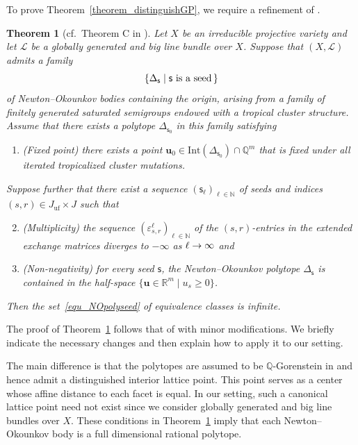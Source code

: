 \documentclass[11pt]{amsart}
\newcommand{\Q}{\mathbb{Q}}
\newcommand{\R}{\mathbb{R}}
\def\mcal{\mathcal}
\numberwithin{equation}{section}
\theoremstyle{plain}
\newtheorem{theorem}{Theorem}[section]
\theoremstyle{definition}
\def\to{\mathchoice{\longrightarrow}{\rightarrow}{\rightarrow}{\rightarrow}}
\numberwithin{equation}{section}
\newcommand{\seed}{\mathsf{s}}
\begin{document}
To prove Theorem~\ref{theorem_distinguishGP}, we require a refinement of \cite[Theorem C]{CKKP25}.

\begin{theorem}[cf.\ Theorem C in \cite{CKKP25}]\label{theorem_maincriterion}
Let $X$ be an irreducible projective variety and let $\mathcal{L}$ be a globally generated and big line bundle over $X$. Suppose that $(X, \mcal{L})$ admits a family 
$$
\{ \Delta_\seed \mid \mbox{$\seed$ is a seed\,} \}
$$
of Newton--Okounkov bodies containing the origin, arising from a family of finitely generated saturated semigroups endowed with a tropical cluster structure. Assume that there exists a polytope $\Delta_{\seed_0}$ in this family satisfying 
\begin{enumerate}
\item (Fixed point) there exists a point $\mathbf{u}_0 \in \mathrm{Int}(\Delta_{\seed_0}) \cap \Q^m$ that is fixed under all iterated tropicalized cluster mutations. 
\end{enumerate}
Suppose further that there exist a sequence $\left( \seed_\ell \right)_{\ell \in \mathbb{N}}$ of seeds and indices $(s, r) \in J_\mathrm{uf} \times J$ such that
\begin{enumerate}
\setcounter{enumi}{1}
\item (Multiplicity) the sequence $( \varepsilon^\ell_{s, r} )_{\ell \in \mathbb{N}}$ of the $(s, r)$-entries in the extended exchange matrices diverges to $- \infty$ as $\ell \to \infty$ and
\item (Non-negativity) for every seed $\seed$, the Newton--Okounkov polytope $\Delta_{\seed}$ is contained in the half-space $\{ \mathbf{u} \in \R^m \mid u_s \geq 0 \}$.
\end{enumerate}
Then the set~\eqref{equ_NOpolyseed} of equivalence classes is infinite.
\end{theorem}

The proof of Theorem~\ref{theorem_maincriterion} follows that of \cite[Theorem C]{CKKP25} with minor modifications. We briefly indicate the necessary changes and then explain how to apply it to our setting. 

The main difference is that the polytopes are assumed to be $\Q$-Gorenstein in \cite[Theorem C]{CKKP25} and hence admit a distinguished interior lattice point. This point serves as a center whose affine distance to each facet is equal. In our setting, such a canonical lattice point need not exist since we consider globally generated and big line bundles over $X$. These conditions in Theorem~\ref{theorem_maincriterion} imply that each Newton--Okounkov body is a full dimensional rational polytope.
\end{document}
